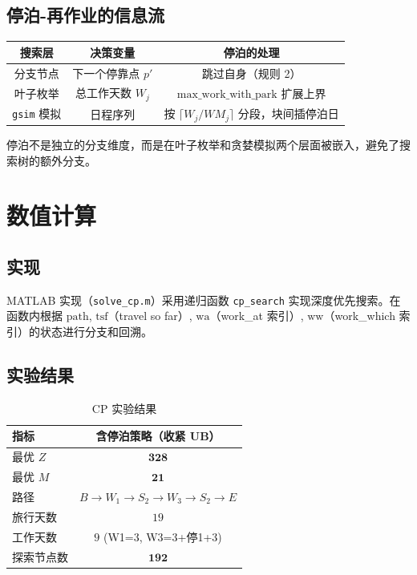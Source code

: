 \documentclass[12pt,a4paper]{ctexart}
\theoremstyle{definition}
\begin{document}
\subsection{停泊-再作业的信息流}

\begin{center}
\begin{tabular}{c|c|c}
  \textbf{搜索层} & \textbf{决策变量} & \textbf{停泊的处理} \\
  \hline
  分支节点 & 下一个停靠点 $p'$ & 跳过自身（规则 2） \\
  叶子枚举 & 总工作天数 $W_j$ & $\text{max\_work\_with\_park}$ 扩展上界 \\
  \texttt{gsim} 模拟 & 日程序列 & 按 $\lceil W_j/WM_j\rceil$ 分段，块间插停泊日 \\
\end{tabular}
\end{center}

停泊不是独立的分支维度，而是在叶子枚举和贪婪模拟两个层面被嵌入，避免了搜索树的额外分支。

\section{数值计算}

\subsection{实现}

MATLAB 实现（\texttt{solve\_cp.m}）采用递归函数 \texttt{cp\_search} 实现深度优先搜索。在函数内根据 $\text{path}$, $\text{tsf}$（travel so far）, $\text{wa}$（work\_at 索引）, $\text{ww}$（work\_which 索引）的状态进行分支和回溯。

\subsection{实验结果}

\begin{table}[H]
  \centering
  \caption{CP 实验结果}
  \begin{tabular}{lc}
    \toprule
    指标 & 含停泊策略（收紧 UB） \\
    \midrule
    最优 $Z$        & $\mathbf{328}$ \\
    最优 $M$        & $\mathbf{21}$ \\
    路径            & $B\!\to\!W_1\!\to\!S_2\!\to\!W_3\!\to\!S_2\!\to\!E$ \\
    旅行天数        & $19$ \\
    工作天数        & $9$ (W1=3, W3=3+停1+3) \\
    探索节点数      & $\mathbf{192}$ \\
    \bottomrule
  \end{tabular}
\end{table}
\end{document}
